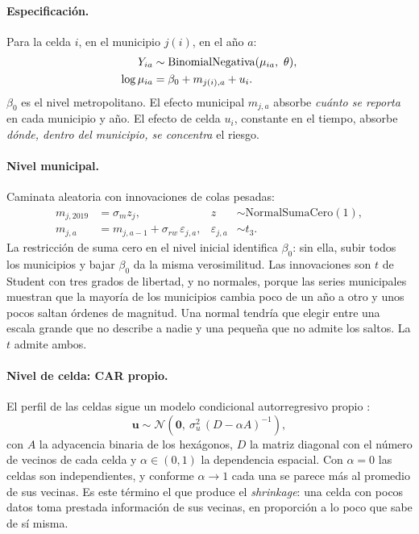 \paragraph{Especificación.} Para la celda $i$, en el municipio $j(i)$, en el
año $a$:
\begin{equation}\label{eq:jerarquico}
	\begin{aligned}
		Y_{ia}        & \sim \mathrm{BinomialNegativa}(\mu_{ia},\ \theta),   \\
		\log \mu_{ia} & = \beta_0 + m_{j(i),a} + u_i .
	\end{aligned}
\end{equation}
$\beta_0$ es el nivel metropolitano. El efecto municipal $m_{j,a}$ absorbe
\emph{cuánto se reporta} en cada municipio y año. El efecto de celda $u_i$,
constante en el tiempo, absorbe \emph{dónde, dentro del municipio, se
	concentra} el riesgo.

\paragraph{Nivel municipal.} Caminata aleatoria con innovaciones de colas
pesadas:
\begin{equation}
	\begin{aligned}
		m_{j,2019} & = \sigma_m z_j,                               & z                 & \sim \mathrm{NormalSumaCero}(1), \\
		m_{j,a}    & = m_{j,a-1} + \sigma_{rw}\,\varepsilon_{j,a}, & \varepsilon_{j,a} & \sim t_3 .
	\end{aligned}
\end{equation}
La restricción de suma cero en el nivel inicial identifica $\beta_0$: sin
ella, subir todos los municipios y bajar $\beta_0$ da la misma
verosimilitud. Las innovaciones son $t$ de Student con tres grados de
libertad, y no normales, porque las series municipales muestran que la
mayoría de los municipios cambia poco de un año a otro y unos pocos saltan
órdenes de magnitud. Una normal tendría que elegir entre una escala grande
que no describe a nadie y una pequeña que no admite los saltos. La $t$
admite ambos.

\paragraph{Nivel de celda: CAR propio.} El perfil de las celdas sigue un
modelo condicional autorregresivo propio \parencite{besag1974spatial}:
\begin{equation}
	\mathbf{u} \sim \mathcal{N}\!\left(\mathbf{0},\
	\sigma_u^2\,(D - \alpha A)^{-1}\right),
\end{equation}
con $A$ la adyacencia binaria de los hexágonos, $D$ la matriz diagonal con
el número de vecinos de cada celda y $\alpha \in (0,1)$ la dependencia
espacial. Con $\alpha = 0$ las celdas son independientes, y conforme
$\alpha \to 1$ cada una se parece más al promedio de sus vecinas. Es este
término el que produce el \emph{shrinkage}: una celda con pocos datos toma
prestada información de sus vecinas, en proporción a lo poco que sabe de sí
misma.

